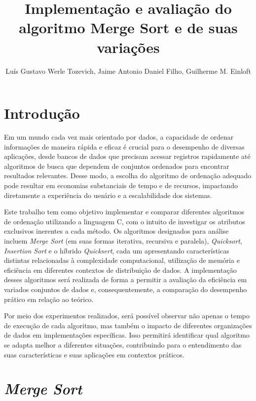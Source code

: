 \documentclass[12pt]{article}
\title{Implementação e avaliação do algoritmo Merge Sort e de suas variações}
\author{Luís Gustavo Werle Tozevich\inst{1}, Jaime Antonio Daniel Filho\inst{1}, Guilherme M. Einloft\inst{1}}
\begin{document}
 

\maketitle

\section{Introdução}


Em um mundo cada vez mais orientado por dados, a capacidade de ordenar informações de maneira rápida e eficaz é crucial para o desempenho de diversas aplicações, desde bancos de dados que precisam acessar registros rapidamente até algoritmos de busca que dependem de conjuntos ordenados para encontrar resultados relevantes. Desse modo, a escolha do algoritmo de ordenação adequado pode resultar em economias substanciais de tempo e de recursos, impactando diretamente a experiência do usuário e a escalabilidade dos sistemas.

Este trabalho tem como objetivo implementar e comparar diferentes algoritmos de ordenação utilizando a linguagem C, com o intuito de investigar os atributos exclusivos inerentes a cada método. Os algoritmos designados para análise incluem \textit{Merge Sort} (em suas formas iterativa, recursiva e paralela), \textit{Quicksort}, \textit{Insertion Sort} e o híbrido \textit{Quicksert}, cada um apresentando características distintas relacionadas à complexidade computacional, utilização de memória e eficiência em diferentes contextos de distribuição de dados. A implementação desses algoritmos será realizada de forma a permitir a avaliação da eficiência em variados conjuntos de dados e, consequentemente, a comparação do desempenho prático em relação ao teórico.

Por meio dos experimentos realizados, será possível observar não apenas o tempo de execução de cada algoritmo, mas também o impacto de diferentes organizações de dados em implementações específicas. Isso permitirá identificar qual algoritmo se adapta melhor a diferentes situações, contribuindo para o entendimento das suas características e suas aplicações em contextos práticos.

\section{\textit{Merge Sort}}
\end{document}
